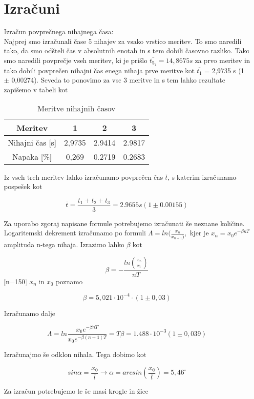 \documentclass[a4paper]{report}
\begin{document}
\section*{Izračuni}
Izračun povprečnega nihajnega časa:\\
Najprej smo izračunali čase 5 nihajev za vsako vrstico meritev. To smo naredili tako, da smo odšteli čas v absolutnih enotah in s tem dobili časovno razliko. Tako smo naredili povprečje vseh meritev, ki je prišlo $ \overline{t_{5_{1}}} = 14,8675 s$ za prvo meritev in tako dobili povprečen nihajni čas enega nihaja prve meritve kot $\overline{{t_1}}$ = 2,9735 s (1 $\pm$ 0,00274). Seveda to ponovimo za vse 3 meritve in s tem lahko rezultate zapišemo v tabeli kot
\\
\begin{table}[H]
    \centering
    \begin{tabular}{c|c|c|c}
        Meritev &1&2&3  \\
        \hline
        Nihajni čas [s] &2,9735 &2.9414&2.9817\\
        Napaka [\%]& 0,269&0.2719&0.2683\\
    \end{tabular}
    \caption{Meritve nihajnih časov}
    \label{tab:my_label}
\end{table}
Iz vseh treh meritev lahko izračunamo povprečen čas $\overline{t}$, s katerim izračunamo pospešek kot 

\[ \overline{t} = \frac{t_1+t_2+t_3  }{3} = 2.9655 s (1\pm 0.00155)\]

Za uporabo zgoraj napisane formule potrebujemo izračunati še neznane količine. \\
Logaritemski dekrement izračunamo po formuli $ \Lambda=ln(\frac{x_n}{x_{n+1})},$ kjer je $x_n = x_0 e^{-\beta n T}$ amplituda n-tega nihaja. Izrazimo lahko $\beta$ kot

\[ \beta = -\frac{ln(\frac{x_n}{x_0})}{nT}\] [n=150] {$x_n$ in $x_0$ poznamo}

\[\beta = 5,021 \cdot 10^{-4}\cdot(1 \pm0,03)\]

Izračunamo dalje 

\[ \Lambda = ln\frac{x_0e^{-\beta nT}}{x_0e^{-\beta (n+1)T}}= T\beta = 1.488\cdot10^{-3} (1\pm0,039)\]

Izračunajmo še odklon nihala. Tega dobimo kot

\[ sin \alpha = \frac{x_0}{l} \longrightarrow \alpha=arcsin(\frac{x_0}{l}) = 5,46^\circ \]

Za izračun potrebujemo le še masi krogle in žice
\end{document}
